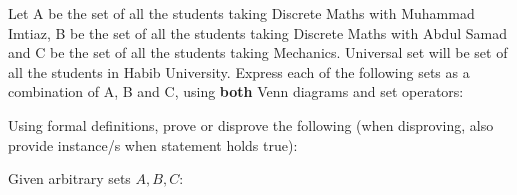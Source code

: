 \documentclass[addpoints]{exam}
\begin{document}
\begin{questions}
\question
Let A be the set of all the students taking Discrete Maths with Muhammad Imtiaz, B be the set of all the students taking Discrete Maths with Abdul Samad and C be the set of all the students taking Mechanics. Universal set will be set of all the students in Habib University. Express each of the following sets as a combination of A, B and C, using \textbf{both} Venn diagrams and set operators:
  
\question
Using formal definitions, prove or disprove the following (when disproving, also provide instance/s when statement holds true):

	Given arbitrary sets $A, B, C$:




\end{questions}
\end{document}
